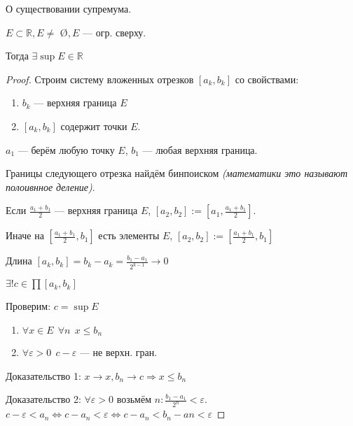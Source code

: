 \begin{theorem}
О существовании супремума.

$E\subset \mathbb{R}, E\not=$ \O $, E$ --- огр. сверху.

Тогда $\exists\sup E \in\mathbb{R}$
\end{theorem}
\begin{proof}
Строим систему вложенных отрезков $[a_k, b_k]$ со свойствами:

\begin{enumerate}
    \item $b_k$ --- верхняя граница $E$
    \item $[a_k, b_k]$ содержит точки $E$.
\end{enumerate}
$a_1$ --- берём любую точку $E$, $b_1$ --- любая верхняя граница.

Границы следующего отрезка найдём бинпоиском \textit{(математики это называют полоивнное деление)}.

Если $\frac{a_1+b_1}{2}$ --- верхняя граница $E$, $[a_2,b_2]:=[a_1, \frac{a_1+b_1}{2}]$.

Иначе на $[\frac{a_1+b_1}{2}, b_1]$ есть элементы $E$, $[a_2,b_2]:=[\frac{a_1+b_1}{2}, b_1]$

Длина $[a_k,b_k]=b_k-a_k=\frac{b_1-a_1}{2^{k-1}}\to0$

$\exists!c\in \prod [a_k, b_k]$

Проверим: $c=\sup E$

\begin{enumerate}
\item $\forall x\in E \ \ \forall n \ \ x\leq b_n$
\item $\forall \varepsilon > 0 \ \ c-\varepsilon$ --- не верхн. гран.
\end{enumerate}

Доказательство 1: $x\to x, b_n\to c \Rightarrow x\leq b_n$

Доказательство 2: $\forall \varepsilon > 0$ возьмём $n: \frac{b_1 - a_1}{2^{n}}<\varepsilon$. $c-\varepsilon<a_n \Leftrightarrow c-a_n<\varepsilon \Leftrightarrow c-a_n<b_n-an<\varepsilon$
\end{proof}

